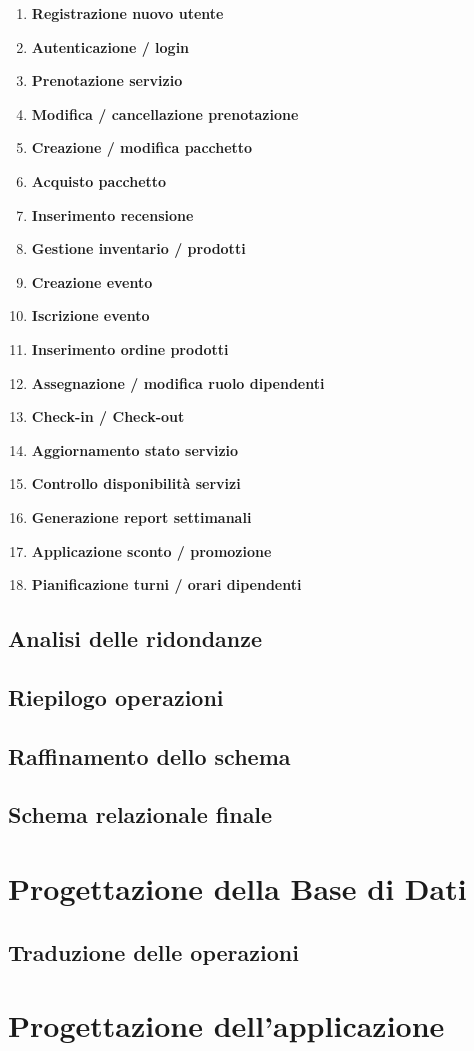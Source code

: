 \documentclass[a4paper,12pt]{report}
\begin{document}
\begin{enumerate}
	\item \textbf{Registrazione nuovo utente} \label{op1}
	\item \textbf{Autenticazione / login} \label{op2}
	\item \textbf{Prenotazione servizio} \label{op3}
	\item \textbf{Modifica / cancellazione prenotazione} \label{op4}
	\item \textbf{Creazione / modifica pacchetto} \label{op5}
	\item \textbf{Acquisto pacchetto} \label{op6}
	\item \textbf{Inserimento recensione} \label{op7}
	\item \textbf{Gestione inventario / prodotti} \label{op8}
	\item \textbf{Creazione evento} \label{op9}
	\item \textbf{Iscrizione evento} \label{op10}
	\item \textbf{Inserimento ordine prodotti} \label{op11}
	\item \textbf{Assegnazione / modifica ruolo dipendenti} \label{op12}
	\item \textbf{Check-in / Check-out} \label{op13}
	\item \textbf{Aggiornamento stato servizio} \label{op14}
	\item \textbf{Controllo disponibilità servizi} \label{op15}
	\item \textbf{Generazione report settimanali} \label{op16}
	\item \textbf{Applicazione sconto / promozione} \label{op17}
	\item \textbf{Pianificazione turni / orari dipendenti} \label{op18}
\end{enumerate}

\section{Analisi delle ridondanze}

\section{Riepilogo operazioni}

\section{Raffinamento dello schema}

\section{Schema relazionale finale}

\chapter{Progettazione della Base di Dati}
\section{Traduzione delle operazioni}

\chapter{Progettazione dell'applicazione}
\end{document}
